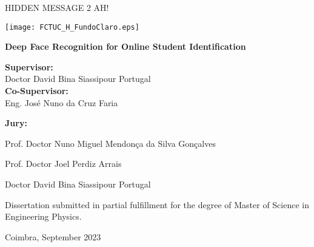 \documentclass[class=report, crop=false, a4paper]{standalone}
\begin{document}
\newpage
\color{white}\selectfont
HIDDEN MESSAGE 2 AH!
\restoregeometry
\newpage
\color{black}\selectfont
\begin{center}
    
    \vspace*{1cm}
    \texttt{[image: FCTUC\_H\_FundoClaro.eps]}
    
    \vspace{2.7cm}
    \selectfont\huge{\textbf{Deep Face Recognition for Online Student Identification}}\par
    
    \vspace{1.5cm}
    \large{\textbf{Supervisor:}}
    \\\large{Doctor David Bina Siassipour Portugal}
    \vspace{5mm}
    \\\large{\textbf{Co-Supervisor:}}
    \\\large{Eng. José Nuno da Cruz Faria}

    \vspace{1cm}
    {\large{\textbf{Jury:}
    
    Prof. Doctor Nuno Miguel Mendonça da Silva Gonçalves
    
    Prof. Doctor Joel Perdiz Arrais
    
    Doctor David Bina Siassipour Portugal
    
    }}
    
    \vfill
    \large{Dissertation submitted in partial fulfillment for the degree of Master of Science in Engineering Physics.}
    
    \vspace{0.5cm}
    {\large Coimbra, September 2023\par}    
    
    
\end{center}
\end{document}
